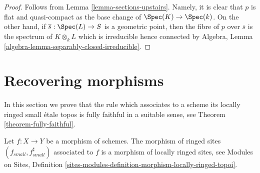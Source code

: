 \begin{proof}
Follows from Lemma \ref{lemma-sections-upstairs}. Namely, it is clear
that $p$ is flat and quasi-compact as the base change of
$\Spec(K) \to \Spec(k)$. On the other hand, if $\overline{s} : \Spec(L) \to S$
is a geometric point, then the fibre of $p$ over $\overline{s}$
is the spectrum of $K \otimes_k L$ which is irreducible hence connected by
Algebra, Lemma \ref{algebra-lemma-separably-closed-irreducible}.
\end{proof}









\section{Recovering morphisms}
\label{section-morphisms}

\noindent
In this section we prove that the rule which associates to a scheme
its locally ringed small \'etale topos is fully faithful in a suitable
sense, see
Theorem \ref{theorem-fully-faithful}.

\begin{lemma}
\label{lemma-morphism-locally-ringed}
Let $f : X \to Y$ be a morphism of schemes.
The morphism of ringed sites $(f_{small}, f_{small}^\sharp)$
associated to $f$ is a morphism of locally ringed sites, see
Modules on Sites,
Definition \ref{sites-modules-definition-morphism-locally-ringed-topoi}.
\end{lemma}

